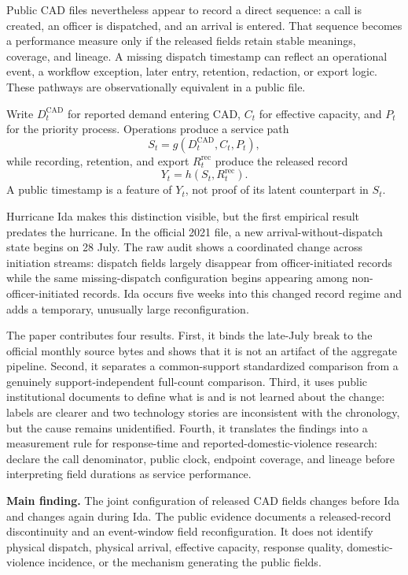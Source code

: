 \documentclass[11pt]{article}
\begin{document}
Public CAD files nevertheless appear to record a direct sequence: a call is created, an officer is dispatched, and an arrival is entered. That sequence becomes a performance measure only if the released fields retain stable meanings, coverage, and lineage. A missing dispatch timestamp can reflect an operational event, a workflow exception, later entry, retention, redaction, or export logic. These pathways are observationally equivalent in a public file.

Write $D_t^{\mathrm{CAD}}$ for reported demand entering CAD, $C_t$ for effective capacity, and $P_t$ for the priority process. Operations produce a service path
\begin{equation}
S_t=g(D_t^{\mathrm{CAD}},C_t,P_t),
\end{equation}
while recording, retention, and export $R_t^{\mathrm{rec}}$ produce the released record
\begin{equation}
Y_t=h(S_t,R_t^{\mathrm{rec}}).
\end{equation}
A public timestamp is a feature of $Y_t$, not proof of its latent counterpart in $S_t$.

Hurricane Ida makes this distinction visible, but the first empirical result predates the hurricane. In the official 2021 file, a new arrival-without-dispatch state begins on 28 July. The raw audit shows a coordinated change across initiation streams: dispatch fields largely disappear from officer-initiated records while the same missing-dispatch configuration begins appearing among non-officer-initiated records. Ida occurs five weeks into this changed record regime and adds a temporary, unusually large reconfiguration.

The paper contributes four results. First, it binds the late-July break to the official monthly source bytes and shows that it is not an artifact of the aggregate pipeline. Second, it separates a common-support standardized comparison from a genuinely support-independent full-count comparison. Third, it uses public institutional documents to define what is and is not learned about the change: labels are clearer and two technology stories are inconsistent with the chronology, but the cause remains unidentified. Fourth, it translates the findings into a measurement rule for response-time and reported-domestic-violence research: declare the call denominator, public clock, endpoint coverage, and lineage before interpreting field durations as service performance.

\begin{resultbox}
\textbf{Main finding.} The joint configuration of released CAD fields changes before Ida and changes again during Ida. The public evidence documents a released-record discontinuity and an event-window field reconfiguration. It does not identify physical dispatch, physical arrival, effective capacity, response quality, domestic-violence incidence, or the mechanism generating the public fields.
\end{resultbox}
\end{document}
